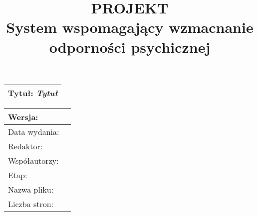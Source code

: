 \documentclass[12pt, letterpaper]{article}
\title{
    \textbf{PROJEKT \\ [.3cm] %
    \large System wspomagający wzmacnanie odporności psychicznej} \\ [.4cm]
    \date{}
    \author{}
}
\begin{document}
\setlength{\headheight}{15pt}
\pagestyle{fancy}
\fancyhead{} %
\fancyhead[C]{\date{\today}}
\fancyfoot{} %
\fancyfoot[R]{\thepage}

\begin{titlepage}
    \maketitle
    \thispagestyle{empty} %
    \begin{center}
        \begin{tabular}{  m{}  } 
            \hline 
            \Large Tytuł:  \textit{ Tytuł } \\ %
            \hline
        \end{tabular}

        \vspace{1.5cm}


        \vspace{1.5cm}

        \begin{tabular}{ | m{} | m{}|  } 
            \hline
            Wersja: &   \\ %
            \hline
            Data wydania: & \\ %
            \hline
            Redaktor: & \\ %
            \hline
            Współautorzy: & \\ %
            \hline
            Etap: & \\ %
            \hline
            Nazwa pliku: & \\ %
            \hline
            Liczba stron: & \\ %
            \hline
            \end{tabular}
    \end{center}    
\end{titlepage}
\end{document}
